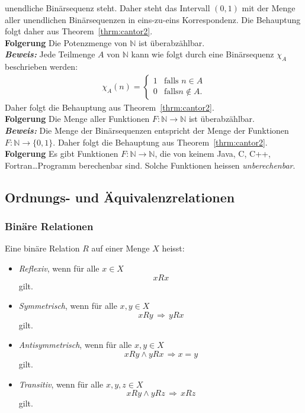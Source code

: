 unendliche Binärsequenz steht. Daher steht das Intervall $(0,1)$ mit der Menge aller unendlichen Binärsequenzen in
eins-zu-eins Korrespondenz. Die Behauptung folgt daher aus Theorem~\ref{thrm:cantor2}.\\
\textbf{Folgerung }
Die Potenzmenge von $\mathbb{N}$ ist überabzählbar. \\
\textbf{\textit{Beweis: }}
Jede Teilmenge $A$ von $\mathbb{N}$ kann wie folgt durch eine Binärsequenz $\chi_A$ beschrieben werden:
\begin{align*}
\chi_A(n)=\begin{cases}
1&\text{falls } n\in A\\
0&\text{falls} n\notin A.
\end{cases}
\end{align*}
Daher folgt die Behauptung aus Theorem~\ref{thrm:cantor2}.\\
\textbf{Folgerung }
Die Menge aller Funktionen $F:\mathbb{N}\to\mathbb{N}$ ist überabzählbar. \\
\textbf{\textit{Beweis: }}
Die Menge der Binärsequenzen entspricht der Menge der Funktionen $F:\mathbb{N}\to\{0,1\}$. Daher folgt die Behauptung
aus Theorem~\ref{thrm:cantor2}. \\
\textbf{Folgerung }
Es gibt Funktionen $F:\mathbb{N}\to\mathbb{N}$, die von keinem Java, C, C++, Fortran\dots Programm berechenbar sind. Solche Funktionen heissen \textit{unberechenbar}.

\subsection{Ordnungs- und Äquivalenzrelationen}%
\label{sub:ordnungs_und_äquivalenzrelationen}

\subsubsection{Binäre Relationen}%
\label{ssub:binäre_relationen}
Eine binäre Relation $R$ auf einer Menge $X$ heisst:
    \begin{itemize}
    \item \textit{Reflexiv}, wenn für alle $x\in X$
    \[
    xRx
    \]
    gilt.
    \item \textit{Symmetrisch}, wenn für alle $x,y\in X$
    \[
    xRy\,\Rightarrow\, yRx
    \]
    gilt.
    \item \textit{Antisymmetrisch}, wenn für alle $x,y\in X$
    \[
xRy\land yRx\,\Rightarrow x=y
\]
gilt.
\item \textit{Transitiv}, wenn für alle $x,y,z\in X$
\[
xRy\land yRz\,\Rightarrow \, xRz
\]
gilt.
\end{itemize}
